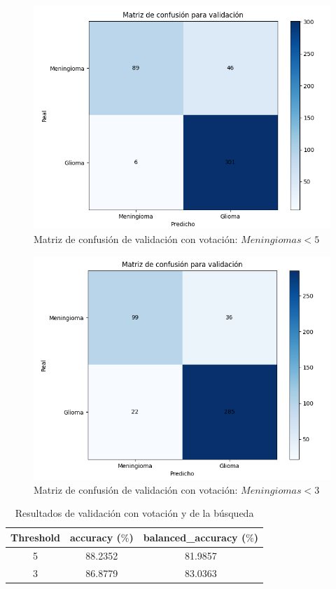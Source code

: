 \begin{figure}[H]
	\centering
	\includegraphics[width=0.8\linewidth]{imagenes/task1_val_5.png}
	\caption{Matriz de confusión de validación con votación: $Meningiomas < 5$}
\end{figure}

\begin{figure}[H]
	\centering
	\includegraphics[width=0.8\linewidth]{imagenes/task1_val_3.png}
	\caption{Matriz de confusión de validación con votación: $Meningiomas < 3$}
\end{figure}

\begin{table}[H]
	\centering
	\begin{tabular}{|ccc|}
		\toprule
		Threshold & accuracy ($\%$) & balanced\_accuracy ($\%$) \\
		\midrule
		5 & 88.2352 & 81.9857 \\ 
		3 & 86.8779 & 83.0363  \\ 
		\bottomrule
	\end{tabular}
	\caption{Resultados de validación con votación y de la búsqueda}
	\label{tabla:resultados11}
\end{table}

